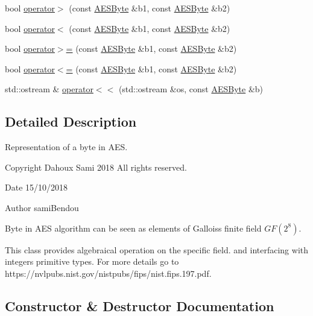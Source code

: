 \begin{DoxyCompactItemize}
\item 
bool \mbox{\hyperlink{class_a_e_s_byte_aa58238c585ec99b8af1f95349d013463}{operator$>$}} (const \mbox{\hyperlink{class_a_e_s_byte}{A\+E\+S\+Byte}} \&b1, const \mbox{\hyperlink{class_a_e_s_byte}{A\+E\+S\+Byte}} \&b2)
\item 
bool \mbox{\hyperlink{class_a_e_s_byte_a24de3dafa3bf5c617366f83099a15656}{operator$<$}} (const \mbox{\hyperlink{class_a_e_s_byte}{A\+E\+S\+Byte}} \&b1, const \mbox{\hyperlink{class_a_e_s_byte}{A\+E\+S\+Byte}} \&b2)
\item 
bool \mbox{\hyperlink{class_a_e_s_byte_a676c2c24ecb18ec4ae60623d21ad72c5}{operator$>$=}} (const \mbox{\hyperlink{class_a_e_s_byte}{A\+E\+S\+Byte}} \&b1, const \mbox{\hyperlink{class_a_e_s_byte}{A\+E\+S\+Byte}} \&b2)
\item 
bool \mbox{\hyperlink{class_a_e_s_byte_ae9209fb9b57d49998d15961f356cd351}{operator$<$=}} (const \mbox{\hyperlink{class_a_e_s_byte}{A\+E\+S\+Byte}} \&b1, const \mbox{\hyperlink{class_a_e_s_byte}{A\+E\+S\+Byte}} \&b2)
\item 
std\+::ostream \& \mbox{\hyperlink{class_a_e_s_byte_a6e506ef4c13b155606735a48f7bb3bb9}{operator$<$$<$}} (std\+::ostream \&os, const \mbox{\hyperlink{class_a_e_s_byte}{A\+E\+S\+Byte}} \&b)
\end{DoxyCompactItemize}


\subsection{Detailed Description}
Representation of a byte in A\+ES. 

\begin{DoxyCopyright}{Copyright}
Dahoux Sami 2018 All rights reserved. 
\end{DoxyCopyright}
\begin{DoxyDate}{Date}
15/10/2018 
\end{DoxyDate}
\begin{DoxyAuthor}{Author}
sami\+Bendou
\end{DoxyAuthor}
Byte in A\+ES algorithm can be seen as elements of Gallois\textquotesingle{}s finite field $ GF(2^8) $. \begin{DoxyVerb}     This class provides algebraical operation on the specific field. and
     interfacing with integers primitive types. For more details go to
     https://nvlpubs.nist.gov/nistpubs/fips/nist.fips.197.pdf.
\end{DoxyVerb}
 

\subsection{Constructor \& Destructor Documentation}
\mbox{\label{class_a_e_s_byte_a89baf49deb1db33de03629e3ebf7c455}} 
